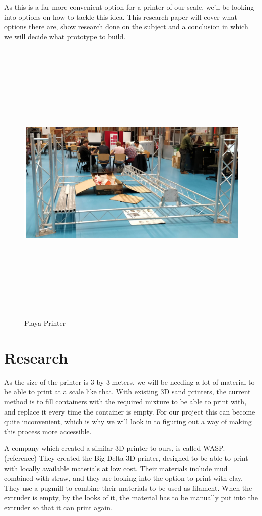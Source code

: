 \documentclass[12pt, a4paper]{article}
\begin{document}
As this is a far more convenient option for a printer of our scale, we'll be looking into options on how to tackle this idea. This research paper will cover what options there are, show research done on the subject and a conclusion in which we will decide what prototype to build.
\begin{figure}[H]
	\centering
	\includegraphics[width=14cm,height=14cm,keepaspectratio]{playaprinter}
	\caption{Playa Printer}
\end{figure}
	\newpage

\section{Research}
As the size of the printer is 3 by 3 meters, we will be needing a lot of material to be able to print at a scale like that. With existing 3D sand printers, the current method is to fill containers with the required mixture to be able to print with, and replace it every time the container is empty. For our project this can become quite inconvenient, which is why we will look in to figuring out a way of making this process more accessible. 
	
A company which created a similar 3D printer to ours, is called WASP. (reference) They created the Big Delta 3D printer, designed to be able to print with locally available materials at low cost. Their materials include mud combined with straw, and they are looking into the option to print with clay. They use a pugmill to combine their materials to be used as filament. When the extruder is empty, by the looks of it, the material has to be manually put into the extruder so that it can print again.
	
\end{document}
